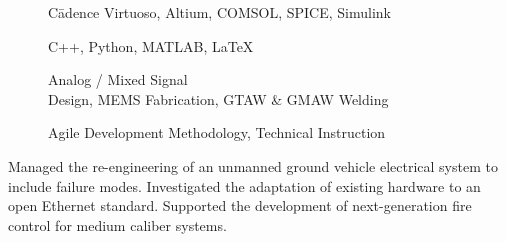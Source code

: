 \documentclass{cv}  %
\begin{document}
\begin{paracol}{2}
\begin{description}
    \item[\faLaptop] \hspace{0.25em} C\=adence Virtuoso, Altium, COMSOL, SPICE, Simulink
\end{description}
\begin{description}
    \item[\faCode] \hspace{0.25em} C++, Python, MATLAB, \LaTeX{}
\end{description}
\begin{description}
    \item[\faWrench] \hspace{0.25em} Analog / Mixed Signal \\Design, MEMS Fabrication, GTAW \& GMAW Welding \par
\end{description}
\begin{description}
    \item[\faHandshake] \hspace{0.25em} Agile Development Methodology, Technical Instruction
\end{description}

\switchcolumn   %


\large{} \hfill \small{} \par\smallskip
\vspace{-8pt}
\small{} \hfill \small{}

\normalsize\rm Managed the re-engineering of an unmanned ground vehicle electrical system to include failure modes. Investigated the adaptation of existing hardware to an open Ethernet standard. Supported the development of next-generation fire control for medium caliber systems.

\hspace{0pt}
\vspace{-20pt}

\divider

\large{} \hfill \small{} \par\smallskip
\vspace{-8pt}
\small{} \hfill \small{}


\end{paracol}
\end{document}
